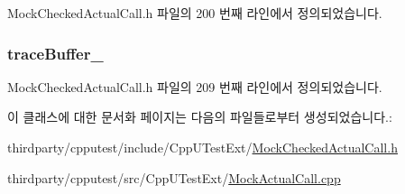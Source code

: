 Mock\+Checked\+Actual\+Call.\+h 파일의 200 번째 라인에서 정의되었습니다.

\subsubsection[{\texorpdfstring{trace\+Buffer\+\_\+}{traceBuffer_}}]{ trace\+Buffer\+\_\+\hspace{0.3cm}{\ttfamily [private]}}\hypertarget{class_mock_actual_call_trace_ab139777fb0949c9d0fbdb4d8b2e63351}{}\label{class_mock_actual_call_trace_ab139777fb0949c9d0fbdb4d8b2e63351}


Mock\+Checked\+Actual\+Call.\+h 파일의 209 번째 라인에서 정의되었습니다.



이 클래스에 대한 문서화 페이지는 다음의 파일들로부터 생성되었습니다.\+:\begin{DoxyCompactItemize}
\item 
thirdparty/cpputest/include/\+Cpp\+U\+Test\+Ext/\hyperlink{_mock_checked_actual_call_8h}{Mock\+Checked\+Actual\+Call.\+h}\item 
thirdparty/cpputest/src/\+Cpp\+U\+Test\+Ext/\hyperlink{_mock_actual_call_8cpp}{Mock\+Actual\+Call.\+cpp}\end{DoxyCompactItemize}
